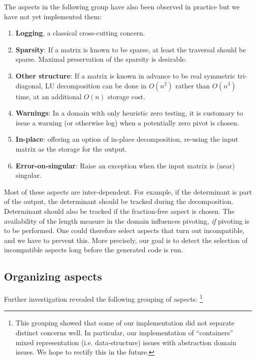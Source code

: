 \documentclass{elsart}
\begin{document}
The aspects in the following group have also been observed in
practice but we have not yet implemented them:
\begin{enumerate}
\setcounter{enumi}{\value{naspects}}
\item \textbf{Logging}, a classical cross-cutting concern.
\item \textbf{Sparsity}: If a matrix is known to be sparse, at least
the traversal should be sparse. Maximal preservation of the sparsity
is desirable. 
\item \textbf{Other structure}: If a matrix is known in
advance to be real symmetric tri-diagonal, LU decomposition can be
done in $O(n^2)$ rather than $O(n^3)$ time, at an additional $O(n)$
storage cost.
\item \textbf{Warnings}: In a domain with only heuristic zero
testing, it is customary to issue a warning (or otherwise log) when 
a potentially zero pivot is chosen.
\item \textbf{In-place}: offering an option of in-place decomposition,
  re-using the input matrix as the storage for the output.
\item \textbf{Error-on-singular}: Raise an exception when the input
  matrix is (near) singular.
\setcounter{naspects}{\value{enumi}}
\end {enumerate}

Most of these aspects are inter-dependent. For example, if the
determinant is part of the output, the determinant should be
tracked during the decomposition. Determinant should also be tracked
if the fraction-free aspect is chosen. The availability of the length
measure in the domain influences pivoting, \emph{if} pivoting
is to be performed. One could therefore select aspects that turn out
incompatible, and we have to prevent this. 
More precisely, our goal is to detect the selection of
incompatible aspects long before the generated code is run.

\subsection{Organizing aspects}\label{sec:aspect-groups}

Further investigation revealed the following grouping of aspects:%
\footnote{This grouping showed that some of our implementation did not
separate distinct concerns well. In
particular, our implementation of ``containers'' 
mixed representation (i.e. data-structure) issues with abstraction
domain issues.  We hope to rectify this in the future.}
\end{document}
